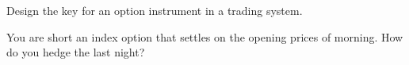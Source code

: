 \begin{interviewq}\label{iq:m1:option-contracts-and-exchanges:5}
Design the key for an option instrument in a trading system.
\end{interviewq}

\begin{interviewq}\label{iq:m1:option-contracts-and-exchanges:6}
You are short an index option that settles on the opening prices of 
morning. How do you hedge the last night?
\end{interviewq}
